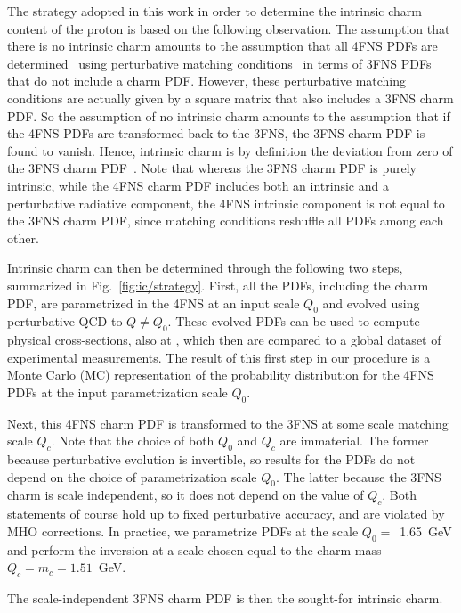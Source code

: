 
The strategy adopted in this work in order to
determine the intrinsic charm content of the proton is 
based on the following
observation.
%
The assumption that there is no intrinsic charm
amounts to the assumption
that all 4FNS PDFs are determined~\cite{Collins:1986mp} using
perturbative matching conditions~\cite{pdfnnlo} in terms of 
3FNS PDFs
that do not include
a charm PDF.
%
However, these perturbative matching conditions are
actually given by a square matrix that also includes a 3FNS charm
PDF.
%
So the assumption of no intrinsic charm amounts to the assumption
that if the 4FNS PDFs are transformed back to the 3FNS, the 3FNS charm
PDF is found to vanish. Hence, intrinsic charm is by definition the
deviation from zero of the 3FNS charm PDF~\cite{Ball:2015dpa}. Note
that whereas the 3FNS charm PDF is purely intrinsic, while the 4FNS
charm PDF includes both an intrinsic and a perturbative
 radiative component, the
4FNS intrinsic component is not equal to the 3FNS charm PDF, since
matching conditions reshuffle all PDFs among each other. 

Intrinsic charm can then be determined through the following two steps,
summarized in Fig.~\ref{fig:ic/strategy}. 
First, all the PDFs, including the charm PDF, are parametrized 
in the 4FNS at an input scale $Q_0$ and evolved 
using \nnlo perturbative QCD to   $Q \not = Q_0$.
%
These evolved PDFs can be used to 
compute physical cross-sections, also at \nnlo, which then are
compared to a global dataset of experimental measurements.
%
The result of this first step in our procedure is 
a Monte Carlo (MC) representation
of the probability distribution for the 4FNS PDFs at the input
parametrization scale $Q_0$.

Next, this 4FNS charm PDF is transformed to the 3FNS at some scale matching scale
$Q_c$.
%
Note that the choice of both $Q_0$ and $Q_c$ are immaterial. The former
because perturbative evolution is invertible, so
results for the PDFs do not depend on the choice of
parametrization scale $Q_0$. The latter because 
the 3FNS charm is scale independent, so it does not depend on the
value of $Q_c$.
Both statements of course hold up to fixed perturbative accuracy, and
are violated by MHO corrections.
%
In practice, we parametrize PDFs at the scale
$Q_0=$~1.65~GeV and perform the inversion at a scale
chosen equal to the charm mass $Q_c=m_c=1.51$~GeV.

The scale-independent 3FNS charm PDF is then the sought-for intrinsic
charm.

